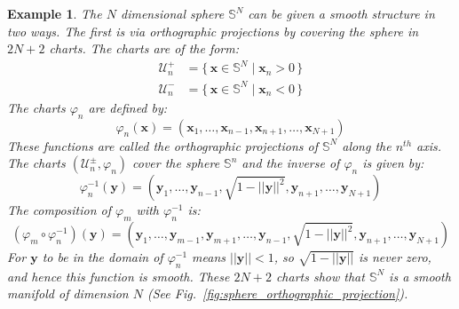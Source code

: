 \documentclass{article}
\theoremstyle{plain}
\theoremstyle{normal}
\newtheorem{example}{Example}[section]
\begin{document}
        \begin{example}
            The $N$ dimensional sphere $\mathbb{S}^{N}$ can be given a smooth
            structure in two ways. The first is via
            \textit{orthographic projections} by covering the sphere in
            $2N+2$ charts. The charts are of the form:
            \begin{align}
                \mathcal{U}_{n}^{+}&=
                    \{\,\mathbf{x}\in\mathbb{S}^{N}\;|\;
                        \mathbf{x}_{n}>0\,\}\\
                \mathcal{U}_{n}^{-}&=
                    \{\,\mathbf{x}\in\mathbb{S}^{N}\;|\;
                        \mathbf{x}_{n}<0\,\}
            \end{align}
            The charts $\varphi_{n}$ are defined by:
            \begin{equation}
                \varphi_{n}(\mathbf{x})
                    =(\mathbf{x}_{1},\dots,\mathbf{x}_{n-1},\mathbf{x}_{n+1},
                    \dots,\mathbf{x}_{N+1})
            \end{equation}
            These functions are called the \textit{orthographic projections}
            of $\mathbb{S}^{N}$ along the $n^{th}$ axis. The charts
            $(\mathcal{U}_{n}^{\pm},\varphi_{n})$ cover the sphere
            $\mathbb{S}^{n}$ and the inverse of
            $\varphi_{n}$ is given by:
            \begin{equation}
                \varphi_{n}^{-1}(\mathbf{y})
                    =(\mathbf{y}_{1},\dots,\mathbf{y}_{n-1},
                    \sqrt{1-||\mathbf{y}||^{2}},
                    \mathbf{y}_{n+1},\dots,\mathbf{y}_{N+1})
            \end{equation}
            The composition of $\varphi_{m}$ with $\varphi_{n}^{-1}$ is:
            \begin{equation}
                (\varphi_{m}\circ\varphi_{n}^{-1})(\mathbf{y})
                    =(\mathbf{y}_{1},\dots,\mathbf{y}_{m-1},\mathbf{y}_{m+1},
                    \dots,\mathbf{y}_{n-1},\sqrt{1-||\mathbf{y}||^{2}},
                    \mathbf{y}_{n+1},\dots,\mathbf{y}_{N+1})
            \end{equation}
            For $\mathbf{y}$ to be in the domain of $\varphi_{n}^{-1}$ means
            $||\mathbf{y}||<1$, so $\sqrt{1-||\mathbf{y}||}$ is never zero, and
            hence this function is smooth. These $2N+2$ charts show that
            $\mathbb{S}^{N}$ is a smooth manifold of dimension $N$
            (See Fig.~\ref{fig:sphere_orthographic_projection}).
        \end{example}
\end{document}
